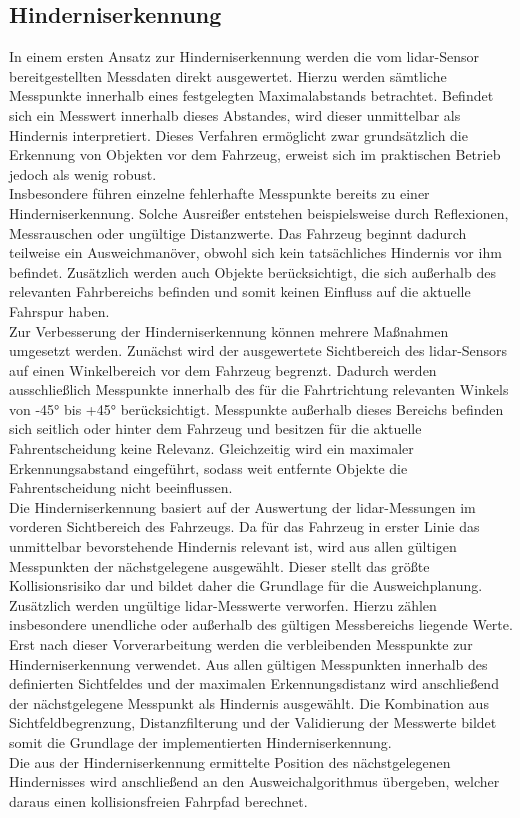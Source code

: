 \subsection{Hinderniserkennung}
\label{sec:hinderniserkennung_elena}
In einem ersten Ansatz zur Hinderniserkennung werden die vom \gls{lidar}-Sensor bereitgestellten Messdaten direkt ausgewertet. Hierzu werden sämtliche Messpunkte innerhalb eines festgelegten Maximalabstands betrachtet. Befindet sich ein Messwert innerhalb dieses Abstandes, wird dieser unmittelbar als Hindernis interpretiert. Dieses Verfahren ermöglicht zwar grundsätzlich die Erkennung von Objekten vor dem Fahrzeug, erweist sich im praktischen Betrieb jedoch als wenig robust.
\\
Insbesondere führen einzelne fehlerhafte Messpunkte bereits zu einer Hinderniserkennung. Solche Ausreißer entstehen beispielsweise durch Reflexionen, Messrauschen oder ungültige Distanzwerte. Das Fahrzeug beginnt dadurch teilweise ein Ausweichmanöver, obwohl sich kein tatsächliches Hindernis vor ihm befindet. Zusätzlich werden auch Objekte berücksichtigt, die sich außerhalb des relevanten Fahrbereichs befinden und somit keinen Einfluss auf die aktuelle Fahrspur haben.
\\
Zur Verbesserung der Hinderniserkennung können mehrere Maßnahmen umgesetzt werden. Zunächst wird der ausgewertete Sichtbereich des \gls{lidar}-Sensors auf einen Winkelbereich vor dem Fahrzeug begrenzt. Dadurch werden ausschließlich Messpunkte innerhalb des für die Fahrtrichtung relevanten Winkels von -45° bis +45° berücksichtigt. Messpunkte außerhalb dieses Bereichs befinden sich seitlich oder hinter dem Fahrzeug und besitzen für die aktuelle Fahrentscheidung keine Relevanz. Gleichzeitig wird ein maximaler Erkennungsabstand eingeführt, sodass weit entfernte Objekte die Fahrentscheidung nicht beeinflussen.
\\
Die Hinderniserkennung basiert auf der Auswertung der \gls{lidar}-Messungen im vorderen Sichtbereich des Fahrzeugs. Da für das Fahrzeug in erster Linie das unmittelbar bevorstehende Hindernis relevant ist, wird aus allen gültigen Messpunkten der nächstgelegene ausgewählt. Dieser stellt das größte Kollisionsrisiko dar und bildet daher die Grundlage für die Ausweichplanung.
\\
Zusätzlich werden ungültige \gls{lidar}-Messwerte verworfen. Hierzu zählen insbesondere unendliche oder außerhalb des gültigen Messbereichs liegende Werte. Erst nach dieser Vorverarbeitung werden die verbleibenden Messpunkte zur Hinderniserkennung verwendet. Aus allen gültigen Messpunkten innerhalb des definierten Sichtfeldes und der maximalen Erkennungsdistanz wird anschließend der nächstgelegene Messpunkt als Hindernis ausgewählt. Die Kombination aus Sichtfeldbegrenzung, Distanzfilterung und der Validierung der Messwerte bildet somit die Grundlage der implementierten Hinderniserkennung.
\\
Die aus der Hinderniserkennung ermittelte Position des nächstgelegenen Hindernisses wird anschließend an den Ausweichalgorithmus übergeben, welcher daraus einen kollisionsfreien Fahrpfad berechnet.

